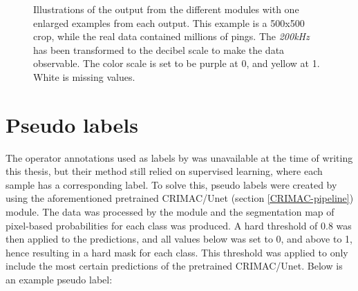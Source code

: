         
        \begin{figure}[H]
            \centering
            
            \caption[Module outputs illustration]{Illustrations of the output from the different modules with one enlarged examples from each output. This example is a 500x500 crop, while the real data contained millions of pings. The \textit{200kHz} has been transformed to the decibel scale to make the data observable. The color scale is set to be purple at 0, and yellow at 1. White is missing values.}
          	\medskip 
            \label{Module_outputs_illustration_fig}
        \end{figure}

    \section{Pseudo labels} \label{Pseudo label}
        The operator annotations used as labels by \citeauthor{brautaset2020acoustic} was unavailable at the time of writing this thesis, but their method still relied on supervised learning, where each sample has a corresponding label. To solve this, pseudo labels were created by using the aforementioned pretrained CRIMAC/Unet (section \ref{CRIMAC-pipeline}) module. The data was processed by the module and the segmentation map of pixel-based probabilities for each class was produced. A hard threshold of 0.8 was then applied to the predictions, and all values below was set to 0, and above to 1, hence resulting in a hard mask for each class. This threshold was applied to only include the most certain predictions of the pretrained CRIMAC/Unet. Below is an example pseudo label:
        

